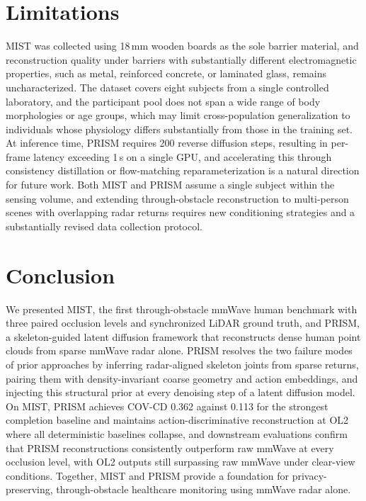 \documentclass{article}
\begin{document}
\section{Limitations}
\label{sec:limitations}

MIST was collected using 18\,mm wooden boards as the sole barrier material, and reconstruction quality under barriers with substantially different electromagnetic properties, such as metal, reinforced concrete, or laminated glass, remains uncharacterized.
The dataset covers eight subjects from a single controlled laboratory, and the participant pool does not span a wide range of body morphologies or age groups, which may limit cross-population generalization to individuals whose physiology differs substantially from those in the training set.
At inference time, PRISM requires 200 reverse diffusion steps, resulting in per-frame latency exceeding 1\,s on a single GPU, and accelerating this through consistency distillation or flow-matching reparameterization is a natural direction for future work.
Both MIST and PRISM assume a single subject within the sensing volume, and extending through-obstacle reconstruction to multi-person scenes with overlapping radar returns requires new conditioning strategies and a substantially revised data collection protocol.

\section{Conclusion}
\label{sec:conclusion}

We presented MIST, the first through-obstacle mmWave human benchmark with three
paired occlusion levels and synchronized LiDAR ground truth, and PRISM, a
skeleton-guided latent diffusion framework that reconstructs dense human point
clouds from sparse mmWave radar alone.
PRISM resolves the two failure modes of prior approaches by inferring radar-aligned
skeleton joints from sparse returns, pairing them with density-invariant coarse
geometry and action embeddings, and injecting this structural prior at every
denoising step of a latent diffusion model.
On MIST, PRISM achieves COV-CD 0.362 against 0.113 for the strongest completion
baseline and maintains action-discriminative reconstruction at OL2 where all
deterministic baselines collapse, and downstream evaluations confirm that PRISM
reconstructions consistently outperform raw mmWave at every occlusion level, with
OL2 outputs still surpassing raw mmWave under clear-view conditions.
Together, MIST and PRISM provide a foundation for privacy-preserving,
through-obstacle healthcare monitoring using mmWave radar alone.
\end{document}
